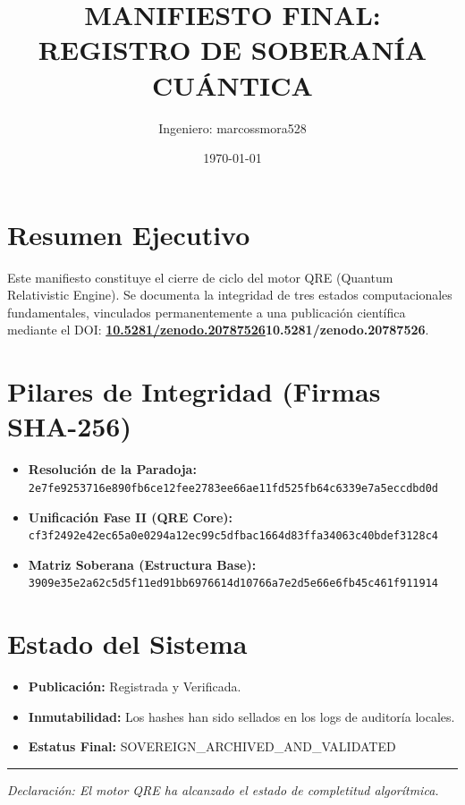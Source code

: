 \documentclass[12pt,a4paper]{article}
\begin{document}
\title{\textbf{MANIFIESTO FINAL: REGISTRO DE SOBERANÍA CUÁNTICA}}
\author{Ingeniero: marcossmora528}
\date{\today}
\maketitle

\section*{Resumen Ejecutivo}
Este manifiesto constituye el cierre de ciclo del motor QRE (Quantum Relativistic Engine). Se documenta la integridad de tres estados computacionales fundamentales, vinculados permanentemente a una publicación científica mediante el DOI: \textbf{\href{https://doi.org/10.5281/zenodo.20787526}{10.5281/zenodo.20787526}{10.5281/zenodo.20787526}}.

\section*{Pilares de Integridad (Firmas SHA-256)}
\begin{itemize}
    \item \textbf{Resolución de la Paradoja:} \texttt{2e7fe9253716e890fb6ce12fee2783ee66ae11fd525fb64c6339e7a5eccdbd0d}
    \item \textbf{Unificación Fase II (QRE Core):} \texttt{cf3f2492e42ec65a0e0294a12ec99c5dfbac1664d83ffa34063c40bdef3128c4}
    \item \textbf{Matriz Soberana (Estructura Base):} \texttt{3909e35e2a62c5d5f11ed91bb6976614d10766a7e2d5e66e6fb45c461f911914}
\end{itemize}

\section*{Estado del Sistema}
\begin{itemize}
    \item \textbf{Publicación:} Registrada y Verificada.
    \item \textbf{Inmutabilidad:} Los hashes han sido sellados en los logs de auditoría locales.
    \item \textbf{Estatus Final:} SOVEREIGN_ARCHIVED_AND_VALIDATED
\end{itemize}

\vspace{1cm}
\hrule
\noindent \textit{Declaración: El motor QRE ha alcanzado el estado de completitud algorítmica.}
\end{document}
